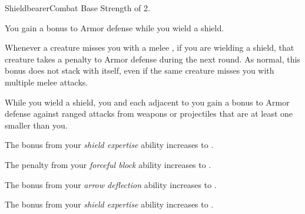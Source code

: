     \begin{feat}{Shieldbearer}{Combat}
        \featpre Base Strength of 2.

         You gain a  bonus to Armor defense while you wield a shield.

         Whenever a creature misses you with a melee , if you are wielding a shield, that creature takes a  penalty to Armor defense during the next round.
        As normal, this bonus does not stack with itself, even if the same creature misses you with multiple melee attacks.

         While you wield a shield, you and each  adjacent to you gain a  bonus to Armor defense against  ranged attacks from weapons or projectiles that are at least one  smaller than you.

         The bonus from your \textit{shield expertise} ability increases to .

         The penalty from your \textit{forceful block} ability increases to .

         The bonus from your \textit{arrow deflection} ability increases to .

         The bonus from your \textit{shield expertise} ability increases to .
    \end{feat}

